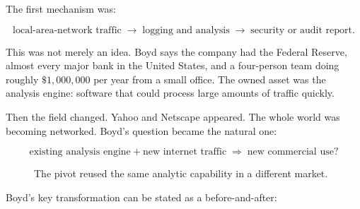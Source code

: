 The first mechanism was:

\begin{equation}
\text{local-area-network traffic}
\;\longrightarrow\;
\text{logging and analysis}
\;\longrightarrow\;
\text{security or audit report}.
\end{equation}

This was not merely an idea. Boyd says the company had the Federal Reserve, almost every major bank in the United States, and a four-person team doing roughly \(\$1{,}000{,}000\) per year from a small office. The owned asset was the analysis engine: software that could process large amounts of traffic quickly.

Then the field changed. Yahoo and Netscape appeared. The whole world was becoming networked. Boyd's question became the natural one:

\begin{equation}
\text{existing analysis engine}
+
\text{new internet traffic}
\;\Longrightarrow\;
\text{new commercial use?}
\end{equation}

\begin{figure}
\centering
{}
\caption{The pivot reused the same analytic capability in a different market.}
\end{figure}

Boyd's key transformation can be stated as a before-and-after:


